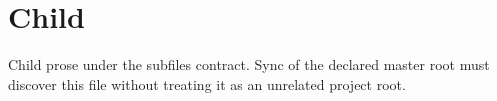 \documentclass[main.tex]{subfiles}
\begin{document}
\section{Child}
\label{sec:child}

Child prose under the subfiles contract. Sync of the declared master root
must discover this file without treating it as an unrelated project root.
\end{document}
